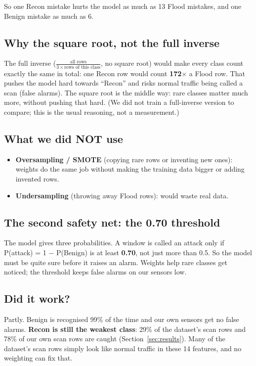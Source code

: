 \documentclass[11pt,a4paper]{article}
\begin{document}
So one Recon mistake hurts the model as much as 13 Flood mistakes, and one Benign mistake as much as 6.

\subsection{Why the square root, not the full inverse}

The full inverse ($\frac{\text{all rows}}{3 \times \text{rows of this class}}$, no square root) would make every
class count exactly the same in total: one Recon row would count \textbf{172$\times$} a Flood row. That pushes the
model hard towards ``Recon'' and risks normal traffic being called a scan (false alarms). The square root is the
middle way: rare classes matter much more, without pushing that hard. (We did not train a full-inverse version to
compare; this is the usual reasoning, not a measurement.)

\subsection{What we did NOT use}

\begin{itemize}
  \item \textbf{Oversampling / SMOTE} (copying rare rows or inventing new ones): weights do the same job without
        making the training data bigger or adding invented rows.
  \item \textbf{Undersampling} (throwing away Flood rows): would waste real data.
\end{itemize}

\subsection{The second safety net: the 0.70 threshold}

The model gives three probabilities. A window is called an attack only if P(attack) = 1 $-$ P(Benign) is at least
\textbf{0.70}, not just more than 0.5. So the model must be quite sure before it raises an alarm. Weights help rare
classes get noticed; the threshold keeps false alarms on our sensors low.

\subsection{Did it work?}

Partly. Benign is recognised 99\% of the time and our own sensors get no false alarms. \textbf{Recon is still the
weakest class}: 29\% of the dataset's scan rows and 78\% of our own scan rows are caught
(Section~\ref{sec:results}). Many of the dataset's scan rows simply look like normal traffic in these 14 features,
and no weighting can fix that.
\end{document}
